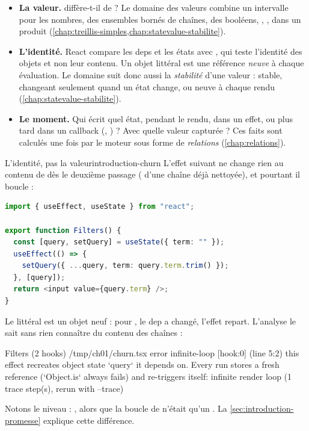 \begin{itemize}
  \item \textbf{La valeur.}  diffère-t-il de  ? Le domaine
    des valeurs combine un intervalle pour les nombres, des ensembles bornés de
    chaînes, des booléens, , , dans un produit
    (\cref{chap:treillis-simples,chap:statevalue-stabilite}).
  \item \textbf{L'identité.} React compare les deps et les états avec
    , qui teste l'identité des objets et non leur contenu. Un
    objet littéral \code{\{\ldots\}} est une référence \emph{neuve} à chaque
    évaluation. Le domaine suit donc aussi la \emph{stabilité} d'une valeur :
    stable, changeant seulement quand un état change, ou neuve à chaque rendu
    (\cref{chap:statevalue-stabilite}).
  \item \textbf{Le moment.} Qui écrit quel état, pendant le rendu, dans un
    effet, ou plus tard dans un callback (, ) ?
    Avec quelle valeur capturée ? Ces faits sont calculés une fois par le moteur
    sous forme de \emph{relations} (\cref{chap:relations}).
\end{itemize}

\begin{exemple}{L'identité, pas la valeur}{introduction-churn}
  L'effet suivant ne \og change\fg{} rien au contenu de  dès le
  deuxième passage ( d'une chaîne déjà nettoyée), et pourtant il
  boucle :
\begin{lstlisting}[language=TypeScript,caption={Un objet recréé à chaque exécution de l'effet (\file{/tmp/ch01/churn.tsx})},label={lst:introduction-churn}]
import { useEffect, useState } from "react";

export function Filters() {
  const [query, setQuery] = useState({ term: "" });
  useEffect(() => {
    setQuery({ ...query, term: query.term.trim() });
  }, [query]);
  return <input value={query.term} />;
}
\end{lstlisting}
  Le littéral  est un objet neuf : pour
  , le dep  a changé, l'effet repart. L'analyse le
  sait sans rien connaître du contenu des chaînes :
\begin{sortie}
  Filters  (2 hooks)  /tmp/ch01/churn.tsx
    error  infinite-loop  [hook:0]  (line 5:2)  this effect recreates object state `query` it depends on. Every run stores a fresh reference (`Object.is` always fails) and re-triggers itself: infinite render loop
       (1 trace step(s), rerun with --trace)
\end{sortie}
  Notons le niveau : , alors que la boucle de 
  n'était qu'un . La \cref{sec:introduction-promesse} explique cette
  différence.
\end{exemple}


